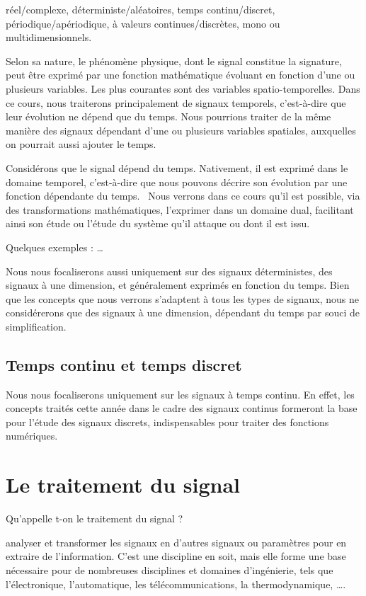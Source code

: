 \documentclass[]{book}
\begin{document}
	réel/complexe, déterministe/aléatoires, temps continu/discret,
	périodique/apériodique, à valeurs continues/discrètes, mono ou
	multidimensionnels.
	
	Selon sa nature, le phénomène physique, dont le signal constitue la
	signature, peut être exprimé par une fonction mathématique évoluant en
	fonction d'une ou plusieurs variables. Les plus courantes sont des
	variables spatio-temporelles. Dans ce cours, nous traiterons
	principalement de signaux temporels, c'est-à-dire que leur évolution ne
	dépend que du temps. Nous pourrions traiter de la même manière des
	signaux dépendant d'une ou plusieurs variables spatiales, auxquelles on
	pourrait aussi ajouter le temps.
	
	Considérons que le signal dépend du temps. Nativement, il est exprimé
	dans le domaine temporel, c'est-à-dire que nous pouvons décrire son
	évolution par une fonction dépendante du temps.~ Nous verrons dans ce
	cours qu'il est possible, via des transformations mathématiques,
	l'exprimer dans un domaine dual, facilitant ainsi son étude ou l'étude
	du système qu'il attaque ou dont il est issu.
	
	Quelques exemples : \ldots{}
	
	Nous nous focaliserons aussi uniquement sur des signaux déterministes,
	des signaux à une dimension, et généralement exprimés en fonction du
	temps. Bien que les concepts que nous verrons s'adaptent à tous les
	types de signaux, nous ne considérerons que des signaux à une dimension,
	dépendant du temps par souci de simplification.
	
	\subsection{Temps continu et temps discret}
	Nous nous focaliserons uniquement sur les signaux à temps continu. En
	effet, les concepts traités cette année dans le cadre des signaux
	continus formeront la base pour l'étude des signaux discrets,
	indispensables pour traiter des fonctions numériques.
	
	\section{Le traitement du signal}
	Qu'appelle t-on le traitement du signal ?
	
	analyser et transformer les signaux en d'autres signaux ou paramètres pour en extraire de l'information.
	C'est une discipline en soit, mais elle forme une base nécessaire pour de nombreuses disciplines et domaines d'ingénierie, tels que l'électronique, l'automatique, les télécommunications, la thermodynamique, ….
	
\end{document}
